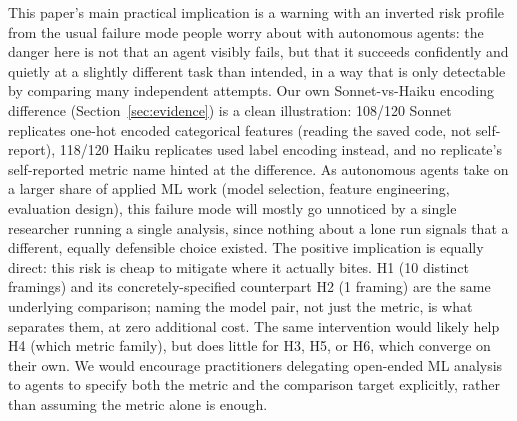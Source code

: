 \documentclass{article}
\begin{document}
This paper's main practical implication is a warning with an inverted risk profile from
the usual failure mode people worry about with autonomous agents: the danger here is not
that an agent visibly fails, but that it succeeds confidently and quietly at a slightly
different task than intended, in a way that is only detectable by comparing many
independent attempts. Our own Sonnet-vs-Haiku encoding difference
(Section~\ref{sec:evidence}) is a clean
illustration: 108/120 Sonnet replicates one-hot encoded categorical features (reading the
saved code, not self-report), 118/120 Haiku replicates used label encoding instead, and
no replicate's self-reported metric name hinted at the difference. As autonomous
agents take on a larger share of applied ML work (model selection, feature engineering,
evaluation design), this failure mode will mostly go unnoticed by a single researcher
running a single analysis, since nothing about a lone run signals that a different, equally
defensible choice existed. The positive implication is equally direct: this risk is cheap
to mitigate where it actually bites. H1 (10 distinct framings) and its
concretely-specified counterpart H2 (1 framing) are the same underlying comparison; naming
the model pair, not just the metric, is what separates them, at zero additional cost. The
same intervention would likely help H4 (which metric family), but does little for H3, H5,
or H6, which converge on their own. We would encourage practitioners delegating open-ended
ML analysis to agents to specify both the metric and the comparison target explicitly,
rather than assuming the metric alone is enough.
\end{document}
